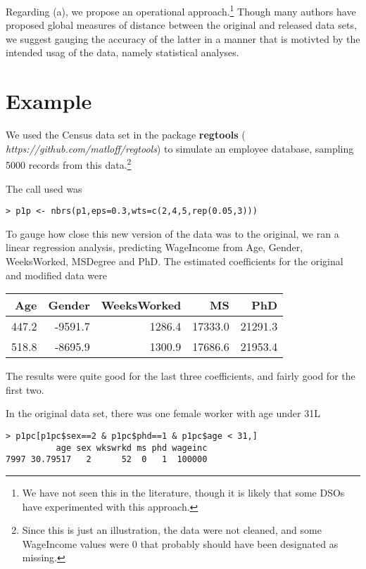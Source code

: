 \documentclass[11pt]{article}
\begin{document}
Regarding (a), we propose an operational approach.\footnote{We have not
seen this in the literature, though it is likely that some DSOs have
experimented with this approach.}  Though many authors have proposed
global measures of distance between the original and released data sets,
we suggest gauging the accuracy of the latter in a manner that is
motivted by the intended usag of the data, namely statistical analyses.

\section{Example}

We used the Census data set in the package {\bf regtools} ({\it
https://github.com/matloff/regtools}) to simulate an employee
database, sampling 5000 records from this data.\footnote{Since this is
just an illustration, the data were not cleaned, and some WageIncome
values were 0 that probably should have been designated as missing.}

The call used was

\begin{lstlisting}
> p1p <- nbrs(p1,eps=0.3,wts=c(2,4,5,rep(0.05,3)))
\end{lstlisting}

To gauge how close this new version of the data was to the original, we 
ran a linear regression analysis, predicting WageIncome from Age,
Gender, WeeksWorked, MSDegree and PhD.  The estimated coefficients
for the original and modified data were

\begin{tabular}{|r|r|r|r|r|}
\hline
Age & Gender & WeeksWorked & MS & PhD \\ \hline 
447.2 & -9591.7 & 1286.4 & 17333.0 & 21291.3 \\ \hline 
518.8 & -8695.9 & 1300.9 & 17686.6 & 21953.4 \\ \hline 
\end{tabular}

The results were quite good for the last three coefficients, and fairly
good for the first two.

In the original data set, there was one female worker with age under 31L

\begin{lstlisting}
> p1pc[p1pc$sex==2 & p1pc$phd==1 & p1pc$age < 31,]
          age sex wkswrkd ms phd wageinc
7997 30.79517   2      52  0   1  100000
\end{lstlisting}
\end{document}
